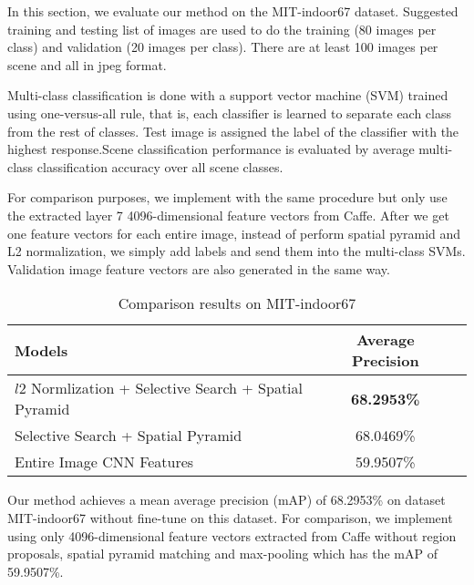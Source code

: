 
In this section, we evaluate our method on the MIT-indoor67 dataset.
Suggested training and
testing list of images are used to do the training (80 images per class)
and validation (20 images per class). There are at least 100 images per
scene and all in jpeg format.

Multi-class classification is done with a support vector machine (SVM) trained
using one-versus-all rule, that is, each classifier is learned to separate each
class from the rest of classes. Test image is assigned the label of the
classifier with the highest response.Scene classification performance is
evaluated by average multi-class classification accuracy over all scene classes.

For comparison purposes, we implement with the same procedure but only use
the extracted layer 7 4096-dimensional feature vectors from Caffe. After we get
one feature vectors for each entire image, instead of perform spatial pyramid
and L2 normalization, we simply add labels and send them into the multi-class
SVMs. Validation image feature vectors are also generated in the same way.

\begin{table*}[ht]
        \caption{Comparison results on MIT-indoor67}
        \centering
        \begin{tabular}{l c c}
        \hline \hline
        Models                & Average Precision \\ \hline
        $l2$ Normlization + Selective Search + Spatial Pyramid & {\bf{68.2953\%}} \\
        Selective Search + Spatial Pyramid & 68.0469\% \\
        Entire Image CNN Features & 59.9507\% \\
        \hline
        \end{tabular}
        \label{tab:overall}
\end{table*}

Our
method achieves a mean average precision (mAP) of 68.2953\% on dataset
MIT-indoor67\cite{Quattoni:2009:RIS} without fine-tune on this dataset.
For comparison, we implement using only 4096-dimensional feature vectors
extracted from Caffe without region proposals, spatial pyramid matching
and max-pooling which has the mAP of 59.9507\%.

